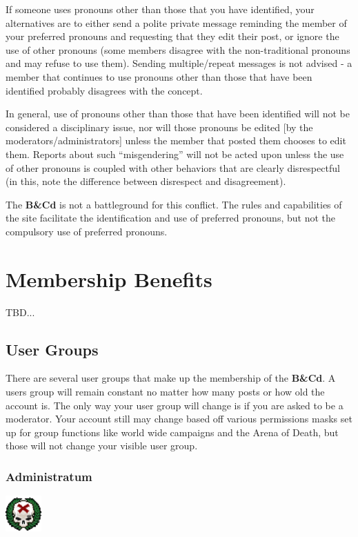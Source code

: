 \documentclass[12pt]{article}
\newcommand{\BnC}{{\textbf{B\&Cd}}}%
\begin{document}
If someone uses pronouns other than those that you have identified, 
your alternatives are to either send a polite private message reminding 
the member of your preferred pronouns and requesting that they edit 
their post, or ignore the use of other pronouns (some members disagree 
with the non-traditional pronouns and may refuse to use them). Sending 
multiple/repeat messages is not advised - a member that continues to 
use pronouns other than those that have been identified probably 
disagrees with the concept.

In general, use of pronouns other than those that have been identified 
will not be considered a disciplinary issue, nor will those pronouns be 
edited [by the moderators/administrators] unless the member that posted 
them chooses to edit them. Reports about such ``misgendering'' will not 
be acted upon unless the use of other pronouns is coupled with other 
behaviors that are clearly disrespectful (in this, note the difference 
between disrespect and disagreement).

The {\BnC} is not a battleground for this conflict. The 
rules and capabilities of the site facilitate the identification and 
use of preferred pronouns, but not the compulsory use of preferred 
pronouns.

\section{Membership Benefits}

TBD...

\subsection{User Groups}

There are several user groups that make up the membership of the
{\BnC}. A users group will remain constant no matter how many 
posts or how old the account is. The only way your user group will 
change is if you are asked to be a moderator. Your account still may 
change based off various permissions masks set up for group functions 
like world wide campaigns and the Arena of Death, but those will not 
change your visible user group.
 

\subsubsection{Administratum}
\includegraphics[width=39pt, height=39pt]{Admin.png}
\end{document}
